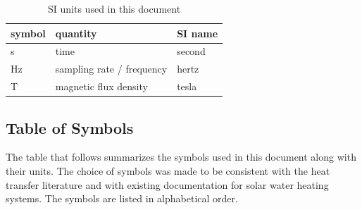 \documentclass[12pt]{article}
\begin{document}
\renewcommand{\arraystretch}{1.2}
\begin{table}[ht]
\noindent \begin{tabular}{l l l}
\toprule
\textbf{symbol} & \textbf{quantity} & \textbf{SI name}\\
\midrule
\si{\second} & time & second\\
\si{\hertz} & sampling rate / frequency & hertz\\
\si{\tesla} & magnetic flux density & tesla\\

\bottomrule
\end{tabular}
\caption{SI units used in this document}
\end{table}





\subsection{Table of Symbols}

The table that follows summarizes the symbols used in this document along with
their units.  The choice of symbols was made to be consistent with the heat
transfer literature and with existing documentation for solar water heating
systems.  The symbols are listed in alphabetical order.
\end{document}
